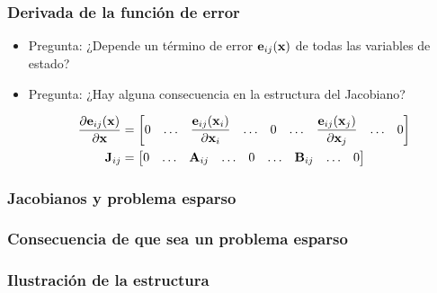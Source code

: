 \begin{frame}
	\frametitle{Derivada de la función de error}
    \begin{itemize}
        \item<1-> Pregunta: ¿Depende un término de error $\boldsymbol{\mathbf{e}}_{ij}(\boldsymbol{\mathbf{x}})$ de todas las variables de estado?
        
        
        \item<3-> Pregunta: ¿Hay alguna consecuencia en la estructura del Jacobiano?
        
        
        \begin{align*}
            \dfrac{\partial\boldsymbol{\mathbf{e}}_{ij}(\boldsymbol{\mathbf{x}})}{\partial\boldsymbol{\mathbf{x}}} &= 
            \begin{bmatrix}
                0 & \dots & \dfrac{\boldsymbol{\mathbf{e}}_{ij}(\boldsymbol{\mathbf{x}}_{i})}{\partial\boldsymbol{\mathbf{x}}_{i}} & \dots & 0 & \dots & \dfrac{\boldsymbol{\mathbf{e}}_{ij}(\boldsymbol{\mathbf{x}}_{j})}{\partial\boldsymbol{\mathbf{x}}_{j}} & \dots & 0
            \end{bmatrix} \\
            \boldsymbol{\mathbf{J}}_{ij} &= 
                \begin{bmatrix}
                    0 & \dots & \boldsymbol{\mathbf{A}}_{ij} & \dots & 0 & \dots & \boldsymbol{\mathbf{B}}_{ij} & \dots & 0
                \end{bmatrix}
        \end{align*}
        
        
    \end{itemize}
	
\end{frame}


\begin{frame}
	\frametitle{Jacobianos y problema esparso}
	
\end{frame}


\begin{frame}
	\frametitle{Consecuencia de que sea un problema esparso}
	
\end{frame}

\begin{frame}
	\frametitle{Ilustración de la estructura}
	
\end{frame}

